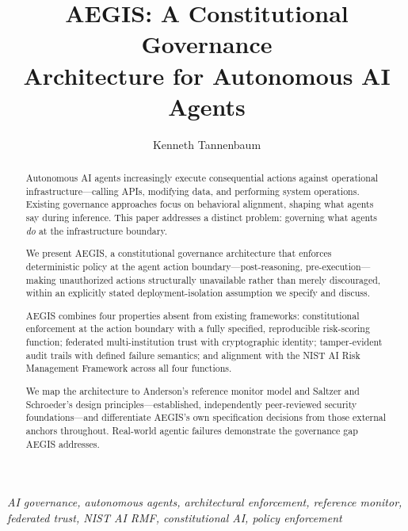 \documentclass{IEEEcsmag}
\begin{document}

\title{AEGIS: A Constitutional Governance\\Architecture for Autonomous AI Agents}

\author{Kenneth Tannenbaum}


\begin{abstract}
Autonomous AI agents increasingly execute consequential actions against operational infrastructure---calling APIs, modifying data, and performing system operations. Existing governance approaches focus on behavioral alignment, shaping what agents say during inference. This paper addresses a distinct problem: governing what agents {\it do} at the infrastructure boundary.

We present AEGIS, a constitutional governance architecture that enforces deterministic policy at the agent action boundary---post-reasoning, pre-execution---making unauthorized actions structurally unavailable rather than merely discouraged, within an explicitly stated deployment-isolation assumption we specify and discuss.

AEGIS combines four properties absent from existing frameworks: constitutional enforcement at the action boundary with a fully specified, reproducible risk-scoring function; federated multi-institution trust with cryptographic identity; tamper-evident audit trails with defined failure semantics; and alignment with the NIST AI Risk Management Framework across all four functions.

We map the architecture to Anderson's reference monitor model and Saltzer and Schroeder's design principles---established, independently peer-reviewed security foundations---and differentiate AEGIS's own specification decisions from those external anchors throughout. Real-world agentic failures demonstrate the governance gap AEGIS addresses.
\end{abstract}

\maketitle
\vspace*{-8pt}
 {\it AI governance, autonomous agents, architectural enforcement, reference monitor, federated trust, NIST AI RMF, constitutional AI, policy enforcement}\vspace{12pt}
\end{document}
